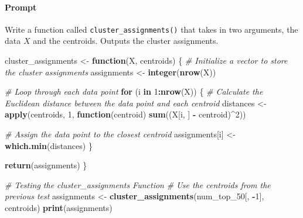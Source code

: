 \documentclass[
]{article}
\newenvironment{Shaded}{\begin{snugshade}}{\end{snugshade}}
\newcommand{\CommentTok}[1]{\textcolor[rgb]{0.56,0.35,0.01}{\textit{#1}}}
\newcommand{\ControlFlowTok}[1]{\textcolor[rgb]{0.13,0.29,0.53}{\textbf{#1}}}
\newcommand{\DecValTok}[1]{\textcolor[rgb]{0.00,0.00,0.81}{#1}}
\newcommand{\FunctionTok}[1]{\textcolor[rgb]{0.13,0.29,0.53}{\textbf{#1}}}
\newcommand{\NormalTok}[1]{#1}
\newcommand{\OtherTok}[1]{\textcolor[rgb]{0.56,0.35,0.01}{#1}}
\newcommand{\SpecialCharTok}[1]{\textcolor[rgb]{0.81,0.36,0.00}{\textbf{#1}}}
\begin{document}
\hypertarget{prompt-1}{%
\paragraph{Prompt}\label{prompt-1}}

Write a function called \texttt{cluster\_assignments()} that takes in
two arguments, the data \(X\) and the centroids. Outputs the cluster
assignments.

\begin{Shaded}
\begin{Highlighting}[]
\NormalTok{cluster\_assignments }\OtherTok{\textless{}{-}} \ControlFlowTok{function}\NormalTok{(X, centroids) \{}
  \CommentTok{\# Initialize a vector to store the cluster assignments}
\NormalTok{  assignments }\OtherTok{\textless{}{-}} \FunctionTok{integer}\NormalTok{(}\FunctionTok{nrow}\NormalTok{(X))}
  
  \CommentTok{\# Loop through each data point}
  \ControlFlowTok{for}\NormalTok{ (i }\ControlFlowTok{in} \DecValTok{1}\SpecialCharTok{:}\FunctionTok{nrow}\NormalTok{(X)) \{}
    \CommentTok{\# Calculate the Euclidean distance between the data point and each centroid}
\NormalTok{    distances }\OtherTok{\textless{}{-}} \FunctionTok{apply}\NormalTok{(centroids, }\DecValTok{1}\NormalTok{, }\ControlFlowTok{function}\NormalTok{(centroid) }\FunctionTok{sum}\NormalTok{((X[i, ] }\SpecialCharTok{{-}}\NormalTok{ centroid)}\SpecialCharTok{\^{}}\DecValTok{2}\NormalTok{))}
    
    \CommentTok{\# Assign the data point to the closest centroid}
\NormalTok{    assignments[i] }\OtherTok{\textless{}{-}} \FunctionTok{which.min}\NormalTok{(distances)}
\NormalTok{  \}}
  
  \FunctionTok{return}\NormalTok{(assignments)}
\NormalTok{\}}
\end{Highlighting}
\end{Shaded}

\begin{Shaded}
\begin{Highlighting}[]
\CommentTok{\# Testing the cluster\_assignments Function}
\CommentTok{\# Use the centroids from the previous test}
\NormalTok{assignments }\OtherTok{\textless{}{-}} \FunctionTok{cluster\_assignments}\NormalTok{(num\_top\_50[, }\SpecialCharTok{{-}}\DecValTok{1}\NormalTok{], centroids)}
\FunctionTok{print}\NormalTok{(assignments)}
\end{Highlighting}
\end{Shaded}
\end{document}
